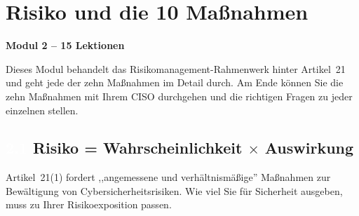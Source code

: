 \documentclass[11pt,a4paper,twoside]{book}
\newcommand{\lessontag}[1]{%
  \texorpdfstring{%
    \setlength{\fboxsep}{3pt}\colorbox{nisd2blue}{\textcolor{white}{\footnotesize\bfseries #1}}\quad%
  }{Lektion #1\ }%
}
\begin{document}

\chapter{Risiko und die 10 Maßnahmen}

\begin{moduleintro}
\textbf{Modul 2 -- 15 Lektionen}

Dieses Modul behandelt das Risikomanagement-Rahmenwerk hinter Artikel~21 und geht jede der zehn Maßnahmen im Detail durch. Am Ende können Sie die zehn Maßnahmen mit Ihrem CISO durchgehen und die richtigen Fragen zu jeder einzelnen stellen.
\end{moduleintro}

\section{\lessontag{2.1}Risiko = Wahrscheinlichkeit $\times$ Auswirkung}

Artikel~21(1) fordert ,,angemessene und verhältnismäßige'' Maßnahmen zur Bewältigung von Cybersicherheitsrisiken. Wie viel Sie für Sicherheit ausgeben, muss zu Ihrer Risikoexposition passen.
\end{document}
